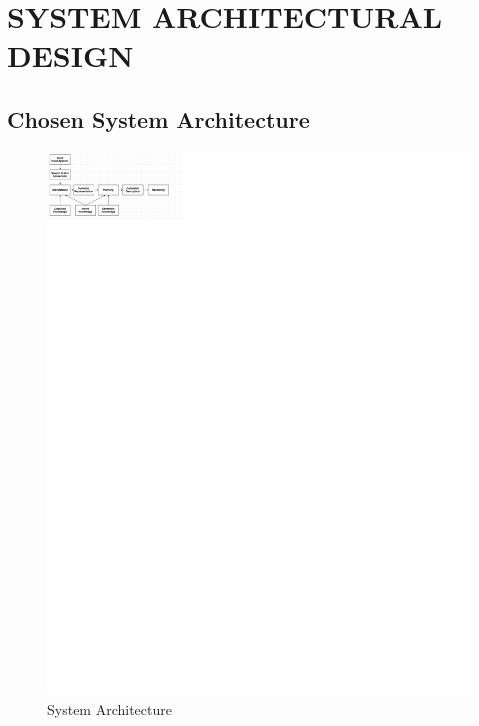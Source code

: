 \documentclass[12pt,a4paper,final,oneside]{report}
\begin{document}
\chapter{SYSTEM ARCHITECTURAL DESIGN}

\section{ Chosen System Architecture}

\begin{figure}[h] 
\begin{center} 
\includegraphics[width=1300px]{architecture.png} \caption{System Architecture} 
\end{center}
\end{figure}
\end{document}
